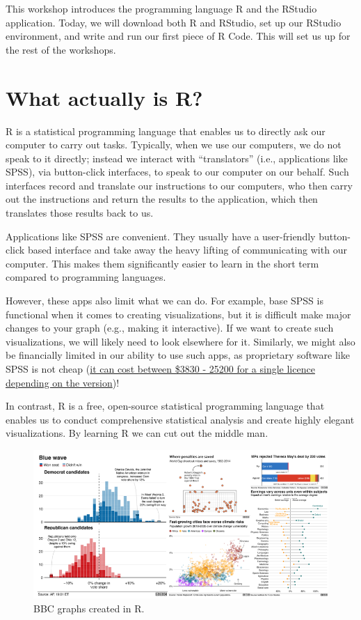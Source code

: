 \documentclass[
]{book}
\begin{document}
This workshop introduces the programming language R and the RStudio application. Today, we will download both R and RStudio, set up our RStudio environment, and write and run our first piece of R Code. This will set us up for the rest of the workshops.

\hypertarget{what-actually-is-r}{%
\section{What actually is R?}\label{what-actually-is-r}}

R is a statistical programming language that enables us to directly ask our computer to carry out tasks. Typically, when we use our computers, we do not speak to it directly; instead we interact with ``translators'' (i.e., applications like SPSS), via button-click interfaces, to speak to our computer on our behalf. Such interfaces record and translate our instructions to our computers, who then carry out the instructions and return the results to the application, which then translates those results back to us.

Applications like SPSS are convenient. They usually have a user-friendly button-click based interface and take away the heavy lifting of communicating with our computer. This makes them significantly easier to learn in the short term compared to programming languages.

However, these apps also limit what we can do. For example, base SPSS is functional when it comes to creating visualizations, but it is difficult make major changes to your graph (e.g., making it interactive). If we want to create such visualizations, we will likely need to look elsewhere for it. Similarly, we might also be financially limited in our ability to use such apps, as proprietary software like SPSS is not cheap (\href{https://www.ibm.com/products/spss-statistics/pricing}{it can cost between \$3830 - 25200 for a single licence depending on the version})!

In contrast, R is a free, open-source statistical programming language that enables us to conduct comprehensive statistical analysis and create highly elegant visualizations. By learning R we can cut out the middle man.

\begin{figure}
\centering
\includegraphics{img/01-bbc.png}
\caption{\label{fig:unnamed-chunk-1}BBC graphs created in R.}
\end{figure}
\end{document}
